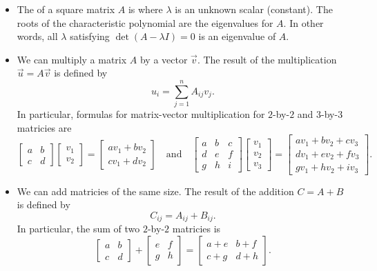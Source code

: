 \documentclass[../main.tex]{subfiles}
\begin{document}
\begin{itemize}
  \item The  of a square matrix \(A\) is  where \(\lambda\) is an unknown scalar (constant).  The roots of the characteristic polynomial are the eigenvalues for \(A\).  In other words, all \(\lambda\) satisfying \(\det(A - \lambda I) = 0\) is an eigenvalue of \(A\).

  \item We can multiply a matrix \(A\) by a vector \(\vec{v}\). The result of the multiplication \(\vec{u} = A\vec{v}\) is defined by \[u_{i} = \sum_{j=1}^{n} A_{ij}v_{j}.\]  In particular, formulas for matrix-vector multiplication for \(2\)-by-\(2\) and \(3\)-by-\(3\) matricies are
\[
  \begin{bmatrix}
    a & b \\
    c & d 
  \end{bmatrix}
  \begin{bmatrix}
    v_{1} \\ v_{2}
  \end{bmatrix}
  = 
  \begin{bmatrix}
    a v_{1} + b v_{2} \\
    c v_{1} + d v_{2}
  \end{bmatrix}
  \quad\text{and}\quad
  \begin{bmatrix}
    a & b & c \\
    d & e & f \\
    g & h & i
  \end{bmatrix}
  \begin{bmatrix}
    v_{1} \\ v_{2} \\ v_{3}
  \end{bmatrix}
  = 
  \begin{bmatrix}
    a v_{1} + b v_{2} + c v_{3} \\
    d v_{1} + e v_{2} + f v_{3} \\
    g v_{1} + h v_{2} + i v_{3}
  \end{bmatrix}.
\]

  \item We can add matricies of the same size. The result of the addition \(C = A + B\) is defined by \[C_{ij} = A_{ij} + B_{ij}.\]  In particular, the sum of two \(2\)-by-\(2\) matricies is
\[
  \begin{bmatrix}
    a & b \\
    c & d
  \end{bmatrix}
  +
  \begin{bmatrix}
    e & f \\
    g & h
  \end{bmatrix}
  =
  \begin{bmatrix}
    a + e & b + f \\
    c + g & d + h
  \end{bmatrix}.
\]


\end{itemize}
\end{document}

